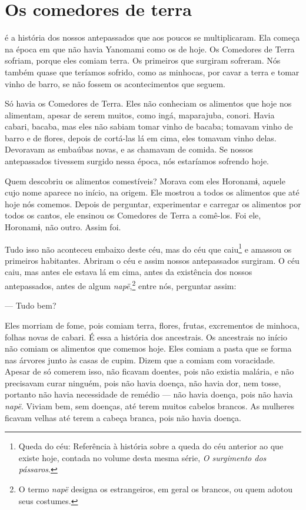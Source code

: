 \chapter{Os comedores de terra}

 é a história dos nossos antepassados que aos poucos se
multiplicaram. Ela começa na época em que não havia Yanomami como os de
hoje. Os Comedores de Terra sofriam, porque eles comiam terra. Os
primeiros que surgiram sofreram. Nós também quase que teríamos sofrido,
como as minhocas, por cavar a terra e tomar vinho de barro, se não
fossem os acontecimentos que seguem. 

Só havia os Comedores de Terra. Eles não conheciam os alimentos que hoje
nos alimentam, apesar de serem muitos, como ingá, maparajuba,
conori. Havia cabari, bacaba, mas eles não sabiam tomar vinho de
bacaba; tomavam vinho de barro e de flores, depois de cortá-las lá em
cima, eles tomavam vinho delas. Devoravam as embaúbas novas, e as
chamavam de comida. Se nossos antepassados tivessem surgido nessa época,
nós estaríamos sofrendo hoje. 

Quem descobriu os alimentos comestíveis? Morava com eles Horonamɨ,
aquele cujo nome aparece no início, na origem. Ele mostrou a todos os
alimentos que até hoje nós comemos. Depois de perguntar, experimentar e
carregar os alimentos por todos os cantos, ele ensinou os Comedores de
Terra a comê-los. Foi ele, Horonamɨ, não outro. Assim foi.

Tudo isso não aconteceu embaixo deste céu, mas do céu que caiu\footnote{Queda do céu: Referência à história sobre a queda do céu anterior ao que existe hoje, contada no volume desta mesma série, \textit{O surgimento dos pássaros}.} e amassou
os primeiros habitantes. Abriram o céu e assim nossos antepassados
surgiram. O céu caiu, mas antes ele estava lá em cima, antes da
existência dos nossos antepassados, antes de algum \textit{napë},\footnote{O termo \textit{napë} designa os estrangeiros, em geral os brancos, ou quem adotou seus costumes.} entre
nós, perguntar assim:

--- Tudo bem? 

Eles morriam de fome, pois comiam terra, flores, frutas,
excrementos de minhoca, folhas novas de cabari. É essa a história dos
ancestrais. Os ancestrais no início não comiam os alimentos que comemos
hoje. Eles comiam a pasta que se forma nas árvores junto às casas de
cupim. Dizem que a comiam com voracidade. Apesar de só comerem isso, não
ficavam doentes, pois não existia malária, e não precisavam curar
ninguém, pois não havia doença, não havia dor, nem tosse, portanto não
havia necessidade de remédio --- não havia doença, pois não
havia \textit{napë}. Viviam bem, sem doenças, até terem muitos cabelos
brancos. As mulheres ficavam velhas até terem a cabeça branca, pois não
havia doença. 

